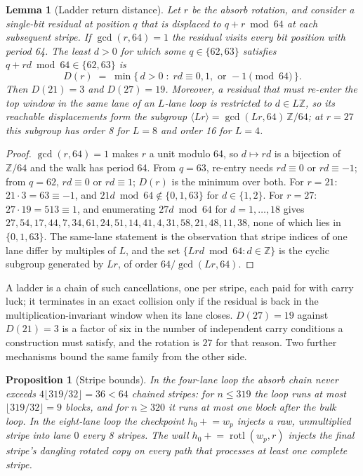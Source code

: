 \documentclass[10pt,a4paper]{article}
\newtheorem{lemma}{Lemma}
\newtheorem{proposition}{Proposition}
\theoremstyle{remark}
\newcommand{\rotl}{\operatorname{rotl}}
\begin{document}
\begin{lemma}[Ladder return distance]
\label{lem:ladder}
Let \(r\) be the absorb rotation, and consider a single-bit residual at
position \(q\) that is displaced to \(q + r \bmod 64\) at each subsequent
stripe.  If \(\gcd(r,64)=1\) the residual visits every bit position with
period 64.  The least \(d>0\) for which some \(q \in \{62,63\}\)
satisfies \(q + rd \bmod 64 \in \{62,63\}\) is
\[
  D(r) \;=\; \min\{\, d>0 \;:\; rd \equiv 0, 1, \text{ or } -1 \pmod{64} \,\}.
\]
Then \(D(21) = 3\) and \(D(27) = 19\).  Moreover, a residual that must
re-enter the top window \emph{in the same lane} of an \(L\)-lane loop is
restricted to \(d \in L\mathbb{Z}\), so its reachable displacements form the
subgroup \(\langle Lr \rangle = \gcd(Lr,64)\,\mathbb{Z}/64\); at \(r=27\)
this subgroup has order 8 for \(L=8\) and order 16 for \(L=4\).
\end{lemma}

\begin{proof}
\(\gcd(r,64)=1\) makes \(r\) a unit modulo 64, so \(d \mapsto rd\) is a
bijection of \(\mathbb{Z}/64\) and the walk has period 64.  From \(q=63\),
re-entry needs \(rd \equiv 0\) or \(rd \equiv -1\); from \(q=62\), \(rd
\equiv 0\) or \(rd \equiv 1\); \(D(r)\) is the minimum over both.  For
\(r=21\): \(21 \cdot 3 = 63 \equiv -1\), and \(21d \bmod 64 \notin
\{0,1,63\}\) for \(d \in \{1,2\}\).  For \(r=27\): \(27 \cdot 19 = 513
\equiv 1\), and enumerating \(27d \bmod 64\) for \(d = 1,\ldots,18\) gives
\(27,54,17,44,7,34,61,24,51,14,41,4,31,58,21,48,11,38\), none of which lies
in \(\{0,1,63\}\).  The same-lane statement is the observation that stripe
indices of one lane differ by multiples of \(L\), and the set
\(\{Lrd \bmod 64 : d \in \mathbb{Z}\}\) is the cyclic subgroup generated by
\(Lr\), of order \(64/\gcd(Lr,64)\).
\end{proof}

A ladder is a chain of such cancellations, one per stripe, each paid for with
carry luck; it terminates in an exact collision only if the residual is back
in the multiplication-invariant window when its lane closes.  \(D(27) = 19\)
against \(D(21) = 3\) is a factor of six in the number of independent carry
conditions a construction must satisfy, and the rotation is \(27\) for that
reason.  Two further mechanisms bound the same family from the other side.

\begin{proposition}[Stripe bounds]
\label{prop:stripes}
In the four-lane loop the absorb chain never exceeds
\(4\lfloor 319/32 \rfloor = 36 < 64\) chained stripes: for \(n \leq 319\) the
loop runs at most \(\lfloor 319/32 \rfloor = 9\) blocks, and for \(n \geq
320\) it runs at most one block after the bulk loop.  In the eight-lane loop
the checkpoint \(h_0 \mathrel{+}= w_p\) injects a raw, unmultiplied stripe
into lane \(0\) every 8 stripes.  The wall \(h_0 \mathrel{+}= \rotl(w_p,r)\)
injects the final stripe's dangling rotated copy on every path that
processes at least one complete stripe.
\end{proposition}
\end{document}
